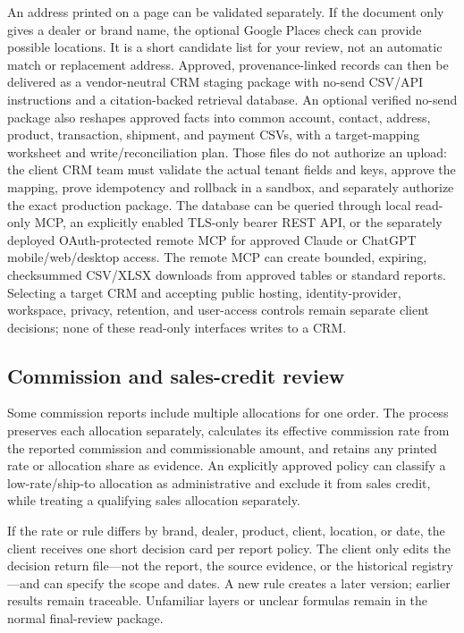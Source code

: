 \documentclass[
]{article}
\begin{document}
An address printed on a page can be validated separately. If the
document only gives a dealer or brand name, the optional Google Places
check can provide possible locations. It is a short candidate list for
your review, not an automatic match or replacement address. Approved,
provenance-linked records can then be delivered as a vendor-neutral CRM
staging package with no-send CSV/API instructions and a citation-backed
retrieval database. An optional verified no-send package also reshapes
approved facts into common account, contact, address, product,
transaction, shipment, and payment CSVs, with a target-mapping worksheet
and write/reconciliation plan. Those files do not authorize an upload:
the client CRM team must validate the actual tenant fields and keys,
approve the mapping, prove idempotency and rollback in a sandbox, and
separately authorize the exact production package. The database can be
queried through local read-only MCP, an explicitly enabled TLS-only
bearer REST API, or the separately deployed OAuth-protected remote MCP
for approved Claude or ChatGPT mobile/web/desktop access. The remote MCP
can create bounded, expiring, checksummed CSV/XLSX downloads from
approved tables or standard reports. Selecting a target CRM and
accepting public hosting, identity-provider, workspace, privacy,
retention, and user-access controls remain separate client decisions;
none of these read-only interfaces writes to a CRM.

\subsection{Commission and sales-credit
review}\label{commission-and-sales-credit-review}

Some commission reports include multiple allocations for one order. The
process preserves each allocation separately, calculates its effective
commission rate from the reported commission and commissionable amount,
and retains any printed rate or allocation share as evidence. An
explicitly approved policy can classify a low-rate/ship-to allocation as
administrative and exclude it from sales credit, while treating a
qualifying sales allocation separately.

If the rate or rule differs by brand, dealer, product, client, location,
or date, the client receives one short decision card per report policy.
The client only edits the decision return file---not the report, the
source evidence, or the historical registry---and can specify the scope
and dates. A new rule creates a later version; earlier results remain
traceable. Unfamiliar layers or unclear formulas remain in the normal
final-review package.
\end{document}

